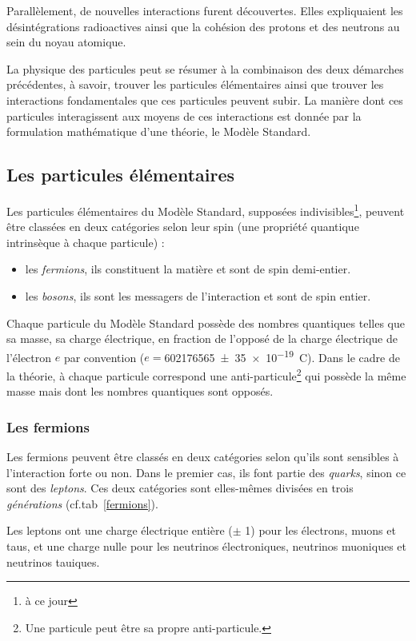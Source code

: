\vspace*{-0.5cm}
Parallèlement, de nouvelles interactions furent découvertes. Elles expliquaient les désintégrations radioactives ainsi que la cohésion des protons et des neutrons au sein du noyau atomique.

La physique des particules peut se résumer à la combinaison des deux démarches précédentes, à savoir, trouver les particules élémentaires ainsi que trouver les interactions fondamentales que ces particules peuvent subir. La manière dont ces particules interagissent aux moyens de ces interactions est donnée par la formulation mathématique d'une théorie, le Modèle Standard.

\subsection{Les particules élémentaires}
Les particules élémentaires du Modèle Standard, supposées indivisibles\footnote{à ce jour}, peuvent être classées en deux catégories selon leur spin (une propriété quantique intrinsèque à chaque particule) :
\begin{itemize}[label=$\bullet$]
\item les \textit{fermions}, ils constituent la matière et sont de spin demi-entier.
\item les \textit{bosons}, ils sont les messagers de l'interaction et sont de spin entier.
\end{itemize}
Chaque particule du Modèle Standard possède des nombres quantiques telles que sa masse, sa charge électrique, en fraction de l'opposé de la charge électrique de l'électron $e$ par convention ($e=$\SI{602 176 565(35)e-19}{\coulomb}). Dans le cadre de la théorie, à chaque particule correspond une anti-particule\footnote{Une particule peut être sa propre anti-particule.} qui possède la même masse mais dont les nombres quantiques sont opposés.

\subsubsection{Les fermions}
Les fermions peuvent être classés en deux catégories selon qu'ils sont sensibles à l'interaction forte ou non. Dans le premier cas, ils font partie des \textit{quarks}, sinon ce sont des \textit{leptons}. Ces deux catégories sont elles-mêmes divisées en trois \textit{générations} (cf.tab~\ref{fermions}).

Les leptons ont une charge électrique entière ($\pm$ \num{1}) pour les électrons, muons et taus, et une charge nulle pour les neutrinos électroniques, neutrinos muoniques et neutrinos tauiques.

